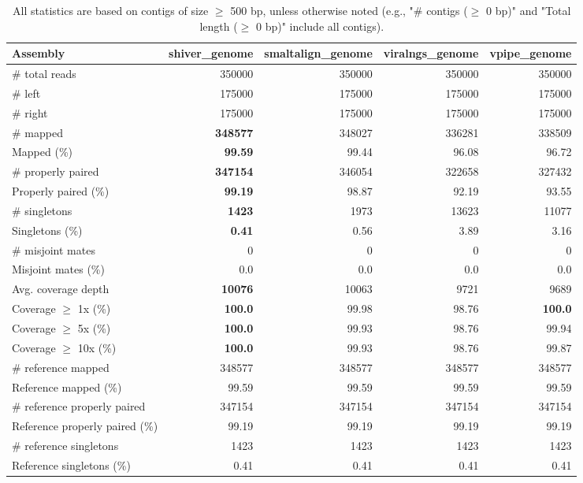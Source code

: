 \documentclass[12pt,a4paper]{article}
\begin{document}
\begin{table}[ht]
\begin{center}
\caption{All statistics are based on contigs of size $\geq$ 500 bp, unless otherwise noted (e.g., "\# contigs ($\geq$ 0 bp)" and "Total length ($\geq$ 0 bp)" include all contigs).}
\begin{tabular}{|l*{4}{|r}|}
\hline
Assembly & shiver\_genome & smaltalign\_genome & viralngs\_genome & vpipe\_genome \\ \hline
\# total reads & 350000 & 350000 & 350000 & 350000 \\ \hline
\# left & 175000 & 175000 & 175000 & 175000 \\ \hline
\# right & 175000 & 175000 & 175000 & 175000 \\ \hline
\# mapped & {\bf 348577} & 348027 & 336281 & 338509 \\ \hline
Mapped (\%) & {\bf 99.59} & 99.44 & 96.08 & 96.72 \\ \hline
\# properly paired & {\bf 347154} & 346054 & 322658 & 327432 \\ \hline
Properly paired (\%) & {\bf 99.19} & 98.87 & 92.19 & 93.55 \\ \hline
\# singletons & {\bf 1423} & 1973 & 13623 & 11077 \\ \hline
Singletons (\%) & {\bf 0.41} & 0.56 & 3.89 & 3.16 \\ \hline
\# misjoint mates & 0 & 0 & 0 & 0 \\ \hline
Misjoint mates (\%) & 0.0 & 0.0 & 0.0 & 0.0 \\ \hline
Avg. coverage depth & {\bf 10076} & 10063 & 9721 & 9689 \\ \hline
Coverage $\geq$ 1x (\%) & {\bf 100.0} & 99.98 & 98.76 & {\bf 100.0} \\ \hline
Coverage $\geq$ 5x (\%) & {\bf 100.0} & 99.93 & 98.76 & 99.94 \\ \hline
Coverage $\geq$ 10x (\%) & {\bf 100.0} & 99.93 & 98.76 & 99.87 \\ \hline
\# reference mapped & 348577 & 348577 & 348577 & 348577 \\ \hline
Reference mapped (\%) & 99.59 & 99.59 & 99.59 & 99.59 \\ \hline
\# reference properly paired & 347154 & 347154 & 347154 & 347154 \\ \hline
Reference properly paired (\%) & 99.19 & 99.19 & 99.19 & 99.19 \\ \hline
\# reference singletons & 1423 & 1423 & 1423 & 1423 \\ \hline
Reference singletons (\%) & 0.41 & 0.41 & 0.41 & 0.41 \\ \hline

\end{tabular}
\end{center}
\end{table}
\end{document}
